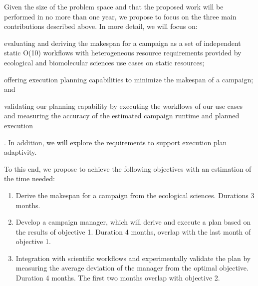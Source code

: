 Given the size of the problem space and that the proposed work will be performed in no more than one year, we propose to focus on the three main contributions described above. In more detail, we will focus on: 
\begin{inparaenum}[(1)]
\item evaluating and deriving the makespan for a campaign as a set of independent static O(10) workflows with heterogeneous resource requirements provided by ecological and biomolecular sciences use cases on static resources; 
\item offering execution planning capabilities to minimize the makespan of a campaign; and 
\item validating our planning capability by executing the workflows of our use cases and measuring the accuracy of the estimated campaign runtime and planned execution
\end{inparaenum}. In addition, we will explore the requirements to support execution plan adaptivity.


To this end, we propose to achieve the following objectives with an estimation of the time needed:
\begin{enumerate}
    \item Derive the makespan for a campaign from the ecological sciences. Durations 3 months.
    \item Develop a campaign manager, which will derive and execute a plan based on the results of objective 1. Duration 4 months, overlap with the last month of objective 1.
    \item Integration with scientific workflows and experimentally validate the plan by measuring the average deviation of the manager from the optimal objective. Duration 4 months. The first two months overlap with objective 2.
\end{enumerate}




